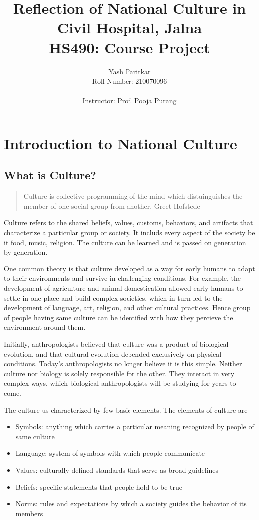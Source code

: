 \documentclass{article}
\title{\textbf{Reflection of National Culture in Civil Hospital, Jalna}\\
HS490: Course Project}
\author{Yash Paritkar\\
Roll Number: 210070096\\ 
\\
Instructor: Prof. Pooja Purang}
\begin{document}
\maketitle

\newpage
\tableofcontents

\newpage
\listoffigures
\newpage
\listoftables

\newpage
\section{Introduction to National Culture}
\subsection{What is Culture?}
\begin{quote}
    Culture is collective programming of the mind which distuinguishes the member of one social group from another.\hfill -Greet Hofstede
\end{quote}

Culture refers to the shared beliefs, values, customs, behaviors, and artifacts that characterize a particular group or society. It includs every aspect of the society be it food, music, religion. The culture can be learned and is passed on generation by generation.

One common theory is that culture developed as a way for early humans to adapt to their environments and survive in challenging conditions. For example, the development of agriculture and animal domestication allowed early humans to settle in one place and build complex societies, which in turn led to the development of language, art, religion, and other cultural practices. Hence group of people having same culture can be identified with how they percieve the environment around them.

Initially, anthropologists believed that culture was a product of biological evolution, and that cultural evolution depended exclusively on physical conditions. Today’s anthropologists no longer believe it is this simple. Neither culture nor biology is solely responsible for the other. They interact in very complex ways, which biological anthropologists will be studying for years to come.

The culture us characterized by few basic elements. The elements of culture are
\begin{itemize}
    \item Symbols: anything which carries a particular meaning recognized by people of same culture
    \item Language: system of symbols with which people communicate
    \item Values: culturally-defined standards that serve as broad guidelines 
    \item Beliefs: specific statements that people hold to be true
    \item Norms: rules and expectations by which a society guides the behavior of its members
\end{itemize}
\end{document}
